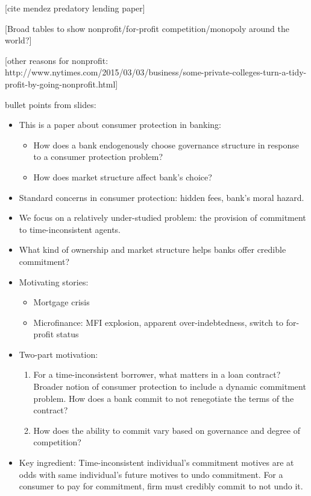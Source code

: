 \documentclass[11pt]{article}%
\begin{document}
\bigskip

[cite mendez predatory lending paper]

[Broad tables to show nonprofit/for-profit competition/monopoly around the world?]

[other reasons for nonprofit: http://www.nytimes.com/2015/03/03/business/some-private-colleges-turn-a-tidy-profit-by-going-nonprofit.html]

\bigskip

bullet points from slides:

\begin{itemize}
\item This is a paper about consumer protection in banking:

\begin{itemize}
\item How does a bank endogenously choose governance structure in response to
a consumer protection problem?

\item How does market structure affect bank's choice?
\end{itemize}

\item Standard concerns in consumer protection: hidden fees, bank's moral hazard.

\item We focus on a relatively under-studied problem: the provision of
commitment to time-inconsistent agents.

\item What kind of ownership and market structure helps banks offer credible commitment?

\item Motivating stories:

\begin{itemize}
\item Mortgage crisis

\item Microfinance: MFI explosion, apparent over-indebtedness, switch to
for-profit status
\end{itemize}

\item Two-part motivation:

\begin{enumerate}
\item For a time-inconsistent borrower, what matters in a loan contract?
Broader notion of consumer protection to include a dynamic commitment problem.
How does a bank commit to not renegotiate the terms of the contract?

\item How does the ability to commit vary based on governance and degree of competition?
\end{enumerate}

\item Key ingredient: Time-inconsistent individual's commitment motives are at
odds with same individual's future motives to undo commitment. For a consumer
to pay for commitment, firm must credibly commit to not undo it.
\end{itemize}
\end{document}
